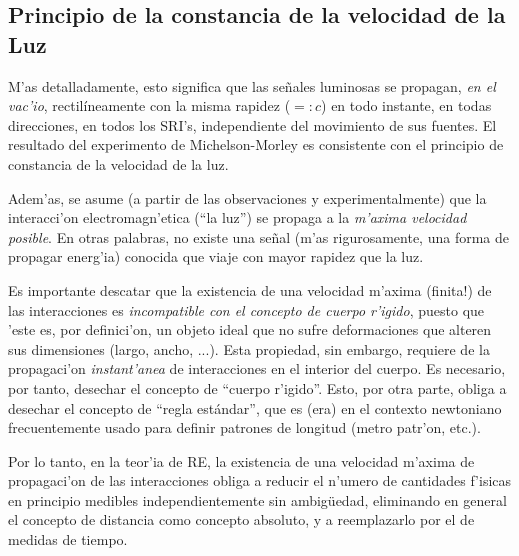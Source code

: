 \subsection{Principio de la constancia de la velocidad de la Luz}
 \begin{quotation}
\end{quotation}
M'as detalladamente, esto significa que las se\~nales luminosas se propagan, \textit{en el vac'io}, rectil\'ineamente con la misma rapidez ($=:c$) en todo instante, en todas direcciones, en todos los SRI's, independiente del movimiento de sus fuentes. El resultado del experimento de Michelson-Morley es consistente con el principio de constancia de la velocidad de la luz.

Adem'as, se asume (a partir de las observaciones y experimentalmente) que la interacci'on electromagn'etica (``la luz'') se propaga a la \textit{m'axima velocidad posible}. En otras palabras, no existe una se\~nal (m'as rigurosamente, una forma de propagar energ'ia) conocida que viaje con mayor rapidez que la luz.

Es importante descatar que la existencia de una velocidad m'axima (finita!) de las interacciones es \textit{incompatible con el concepto de
cuerpo r'igido}, puesto que 'este es, por definici'on, un objeto ideal
que no sufre deformaciones que alteren sus dimensiones (largo, ancho, ...).
Esta propiedad, sin embargo, requiere de la propagaci'on \textit{instant'anea} de interacciones en el interior del cuerpo. Es necesario, por tanto, desechar el concepto de ``cuerpo
r'igido''. Esto, por otra parte, obliga a desechar el concepto de ``regla
est\'andar'', que es (era) en el contexto newtoniano frecuentemente usado para definir patrones de longitud (metro patr'on, etc.).

Por lo tanto, en la teor'ia de RE, la existencia de una velocidad m'axima de propagaci'on de las interacciones obliga a reducir el n'umero de cantidades f'isicas en principio medibles independientemente sin ambig\"uedad, eliminando en general el concepto de distancia como concepto absoluto, y a reemplazarlo por el de medidas de tiempo.

